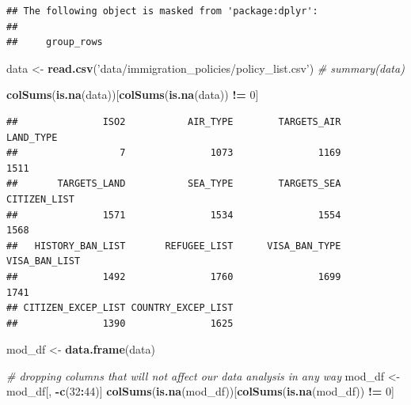 \documentclass[]{article}
\newenvironment{Shaded}{\begin{snugshade}}{\end{snugshade}}
\newcommand{\CommentTok}[1]{\textcolor[rgb]{0.56,0.35,0.01}{\textit{#1}}}
\newcommand{\DecValTok}[1]{\textcolor[rgb]{0.00,0.00,0.81}{#1}}
\newcommand{\KeywordTok}[1]{\textcolor[rgb]{0.13,0.29,0.53}{\textbf{#1}}}
\newcommand{\NormalTok}[1]{#1}
\newcommand{\OperatorTok}[1]{\textcolor[rgb]{0.81,0.36,0.00}{\textbf{#1}}}
\newcommand{\StringTok}[1]{\textcolor[rgb]{0.31,0.60,0.02}{#1}}
\begin{document}
\begin{verbatim}
## The following object is masked from 'package:dplyr':
## 
##     group_rows
\end{verbatim}

\begin{Shaded}
\begin{Highlighting}[]
\NormalTok{data <-}\StringTok{ }\KeywordTok{read.csv}\NormalTok{(}\StringTok{'data/immigration_policies/policy_list.csv'}\NormalTok{)}
\CommentTok{# summary(data)}
\end{Highlighting}
\end{Shaded}

\begin{Shaded}
\begin{Highlighting}[]
\KeywordTok{colSums}\NormalTok{(}\KeywordTok{is.na}\NormalTok{(data))[}\KeywordTok{colSums}\NormalTok{(}\KeywordTok{is.na}\NormalTok{(data)) }\OperatorTok{!=}\StringTok{ }\DecValTok{0}\NormalTok{]}
\end{Highlighting}
\end{Shaded}

\begin{verbatim}
##               ISO2           AIR_TYPE        TARGETS_AIR          LAND_TYPE 
##                  7               1073               1169               1511 
##       TARGETS_LAND           SEA_TYPE        TARGETS_SEA       CITIZEN_LIST 
##               1571               1534               1554               1568 
##   HISTORY_BAN_LIST       REFUGEE_LIST      VISA_BAN_TYPE      VISA_BAN_LIST 
##               1492               1760               1699               1741 
## CITIZEN_EXCEP_LIST COUNTRY_EXCEP_LIST 
##               1390               1625
\end{verbatim}

\begin{Shaded}
\begin{Highlighting}[]
\NormalTok{mod_df <-}\StringTok{ }\KeywordTok{data.frame}\NormalTok{(data)}

\CommentTok{# dropping columns that will not affect our data analysis in any way}
\NormalTok{mod_df <-}\StringTok{ }\NormalTok{mod_df[, }\OperatorTok{-}\KeywordTok{c}\NormalTok{(}\DecValTok{32}\OperatorTok{:}\DecValTok{44}\NormalTok{)]}
\KeywordTok{colSums}\NormalTok{(}\KeywordTok{is.na}\NormalTok{(mod_df))[}\KeywordTok{colSums}\NormalTok{(}\KeywordTok{is.na}\NormalTok{(mod_df)) }\OperatorTok{!=}\StringTok{ }\DecValTok{0}\NormalTok{]}
\end{Highlighting}
\end{Shaded}
\end{document}

